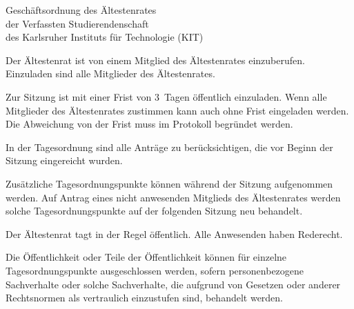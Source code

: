 

\begin{jurdoc}{Geschäftsordnung des Ältestenrates\\der Verfassten Studierendenschaft\\des Karlsruher Instituts für Technologie (KIT)}


\label{aera-go:einberufung}

Der Ältestenrat ist von einem Mitglied des Ältestenrates einzuberufen. Einzuladen sind alle Mitglieder des Ältestenrates.

Zur Sitzung ist mit einer Frist von 3~Tagen öffentlich einzuladen. Wenn alle Mitglieder des Ältestenrates zustimmen kann auch ohne Frist eingeladen werden. Die Abweichung von der Frist muss im Protokoll begründet werden.


\label{aera-go:tagesordnung}

In der Tagesordnung sind alle Anträge zu berücksichtigen, die vor Beginn der Sitzung eingereicht wurden.

Zusätzliche Tagesordnungspunkte können während der Sitzung aufgenommen werden. Auf Antrag eines nicht anwesenden Mitglieds des Ältestenrates werden solche Tagesordnungspunkte auf der folgenden Sitzung neu behandelt.


\label{aera-go:oeffentlichkeit}

Der Ältestenrat tagt in der Regel öffentlich. Alle Anwesenden haben Rederecht.

Die Öffentlichkeit oder Teile der Öffentlichkeit können für einzelne Tagesordnungspunkte ausgeschlossen werden, sofern personenbezogene Sachverhalte oder solche Sachverhalte, die aufgrund von Gesetzen oder anderer Rechtsnormen als vertraulich einzustufen sind, behandelt werden.



\end{jurdoc}
